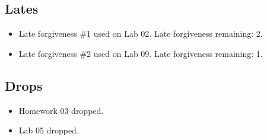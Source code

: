 \documentclass{article}
\begin{document}
\subsection*{Lates}

\begin{itemize}


\item Late forgiveness \#1 used on Lab 02. Late forgiveness remaining: 2.


\item Late forgiveness \#2 used on Lab 09. Late forgiveness remaining: 1.


\end{itemize}


\subsection*{Drops}

\begin{itemize}


\item Homework 03 dropped.


\item Lab 05 dropped.


\end{itemize}
\end{document}
